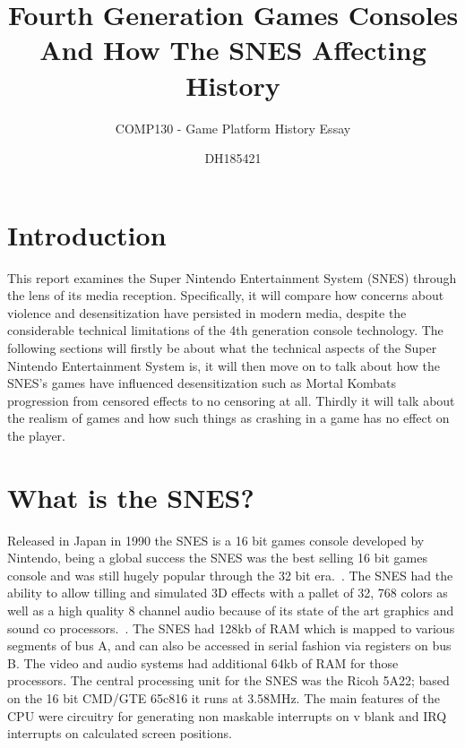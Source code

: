 \documentclass{scrartcl}
\title{Fourth Generation Games Consoles And How The SNES Affecting History}
\subtitle{COMP130 - Game Platform History Essay}
\author{DH185421}
\begin{document}
\maketitle


\section{Introduction}

This report examines the Super Nintendo Entertainment System (SNES) through the lens of its media reception. Specifically, it will compare how concerns about violence and desensitization have persisted in modern media, despite the considerable technical limitations of the 4th generation console technology. The following sections will firstly be about what the technical aspects of the Super Nintendo Entertainment System is, it will then move on to talk about how the SNES's games have influenced desensitization such as Mortal Kombats progression from censored effects to no censoring at all. Thirdly it will talk about the realism of games and how such things as crashing in a game has no effect on the player.
\section{What is the SNES?}
Released in Japan in 1990 the SNES is a 16 bit games console developed by Nintendo, being a global success the SNES was the best selling 16 bit games console and was still hugely popular through the 32 bit era.~\cite{2}. The SNES had the ability to allow tilling and simulated 3D effects with a pallet of 32, 768 colors as well as a high quality 8 channel audio because of its state of the art graphics and sound co processors.~\cite{1}. The SNES had 128kb of RAM which is mapped to various segments of bus A, and can also be accessed in serial fashion via registers on bus B. The video and audio systems had additional 64kb of RAM for those processors. The central processing unit for the SNES was the Ricoh 5A22; based on the 16 bit CMD/GTE 65c816 it runs at 3.58MHz. The main features of the CPU were circuitry for generating non maskable interrupts on v blank and IRQ interrupts on calculated screen positions.~\cite{5}
\end{document}

